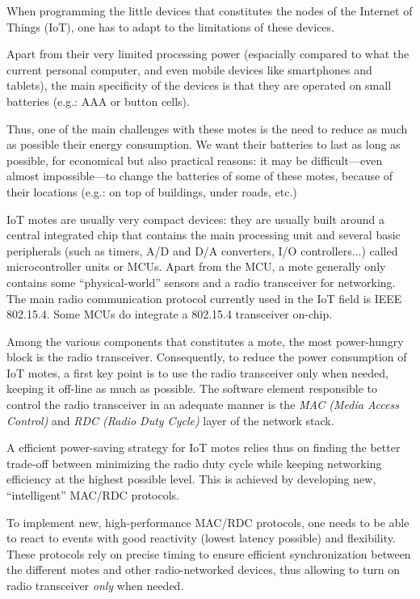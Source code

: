 \documentclass[a4paper,twoside]{article}
\begin{document}
When programming the little devices that constitutes the nodes of
the Internet of Things (IoT), one has to adapt to the limitations of
these devices.

Apart from their very limited processing power (espacially compared to what
the current personal computer, and even mobile devices like smartphones and
tablets), the main specificity of the devices is that they are operated on
small batteries (e.g.: AAA or button cells).

Thus, one of the main challenges with these motes is the need to reduce
as much as possible their energy consumption. We want their batteries to last
as long as possible, for economical but also practical reasons: it may be
difficult---even almost impossible---to change the batteries of some of these
motes, because of their locations (e.g.: on top of buildings, under roads,
etc.)

IoT motes are usually very compact devices: they are usually built around
a central integrated chip that contains the main processing unit and several
basic peripherals (such as timers, A/D and D/A converters, I/O controllers...)
called microcontroller units or MCUs. Apart from the MCU, a mote generally
only contains some ``physical-world'' sensors and a radio transceiver for
networking. The main radio communication protocol currently used in the IoT
field is IEEE 802.15.4. Some MCUs do integrate a 802.15.4 transceiver on-chip.

Among the various components that constitutes a mote, the most power-hungry
block is the radio transceiver. Consequently, to reduce the power consumption
of IoT motes, a first key point is to use the radio transceiver only when
needed, keeping it off-line as much as possible. The software element
responsible to control the radio transceiver in an adequate manner is
the \emph{MAC (Media Access Control)} and \emph{RDC (Radio Duty Cycle)}
layer of the network stack.

A efficient power-saving strategy for IoT motes relies thus on finding the
better trade-off between minimizing the radio duty cycle while keeping
networking efficiency at the highest possible level. This is achieved
by developing new, ``intelligent'' MAC/RDC protocols.

To implement new, high-performance MAC/RDC protocols, one needs to be able
to react to events with good reactivity (lowest latency possible) and
flexibility. These protocols rely on precise timing to ensure efficient
synchronization between the different motes and other radio-networked
devices, thus allowing to turn on radio transceiver \emph{only} when
needed.
\end{document}
